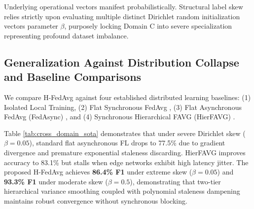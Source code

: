 \documentclass[conference]{IEEEtran}
\begin{document}
Underlying operational vectors manifest probabilistically. Structural label skew relies strictly upon evaluating multiple distinct Dirichlet random initialization vectors parameter $\beta$, purposely locking Domain C into severe specialization representing profound dataset imbalance.

\subsection{Generalization Against Distribution Collapse and Baseline Comparisons}
We compare H-FedAvg against four established distributed learning baselines: (1) Isolated Local Training, (2) Flat Synchronous FedAvg \cite{b1}, (3) Flat Asynchronous FedAvg (FedAsync) \cite{b4}, and (4) Synchronous Hierarchical FAVG (HierFAVG) \cite{b38}.

\begin{table}[htbp]
\centering
\caption{Cross-Domain Generalization and Baseline Comparison Matrix}
\label{tab:cross_domain_sota}
\begin{center}
\end{center}
\end{table}

Table \ref{tab:cross_domain_sota} demonstrates that under severe Dirichlet skew ($\beta = 0.05$), standard flat asynchronous FL drops to 77.5\% due to gradient divergence and premature exponential staleness discarding. HierFAVG improves accuracy to 83.1\% but stalls when edge networks exhibit high latency jitter. The proposed H-FedAvg achieves \textbf{86.4\% F1} under extreme skew ($\beta=0.05$) and \textbf{93.3\% F1} under moderate skew ($\beta=0.5$), demonstrating that two-tier hierarchical variance smoothing coupled with polynomial staleness dampening maintains robust convergence without synchronous blocking.
\end{document}
